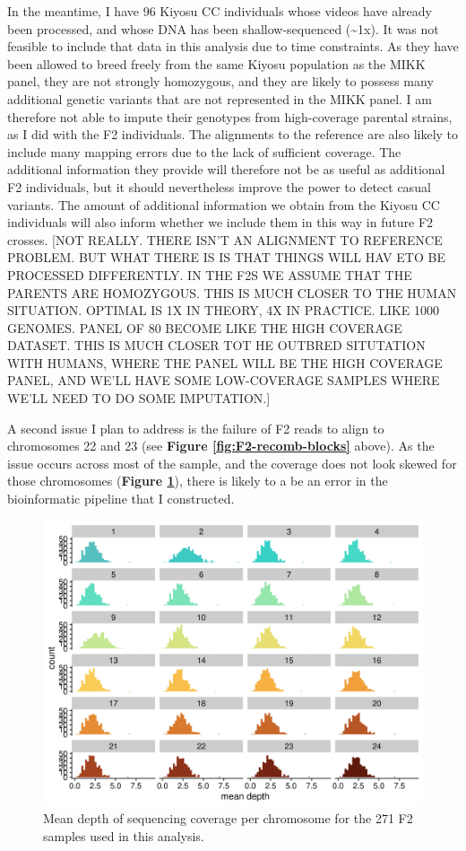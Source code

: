 \documentclass[
]{book}
\begin{document}
In the meantime, I have 96 Kiyosu CC individuals whose videos have already been processed, and whose DNA has been shallow-sequenced (\textasciitilde1x). It was not feasible to include that data in this analysis due to time constraints. As they have been allowed to breed freely from the same Kiyosu population as the MIKK panel, they are not strongly homozygous, and they are likely to possess many additional genetic variants that are not represented in the MIKK panel. I am therefore not able to impute their genotypes from high-coverage parental strains, as I did with the F2 individuals. The alignments to the reference are also likely to include many mapping errors due to the lack of sufficient coverage. The additional information they provide will therefore not be as useful as additional F2 individuals, but it should nevertheless improve the power to detect casual variants. The amount of additional information we obtain from the Kiyosu CC individuals will also inform whether we include them in this way in future F2 crosses. {[}NOT REALLY. THERE ISN'T AN ALIGNMENT TO REFERENCE PROBLEM. BUT WHAT THERE IS IS THAT THINGS WILL HAV ETO BE PROCESSED DIFFERENTLY. IN THE F2S WE ASSUME THAT THE PARENTS ARE HOMOZYGOUS. THIS IS MUCH CLOSER TO THE HUMAN SITUATION. OPTIMAL IS 1X IN THEORY, 4X IN PRACTICE. LIKE 1000 GENOMES. PANEL OF 80 BECOME LIKE THE HIGH COVERAGE DATASET. THIS IS MUCH CLOSER TOT HE OUTBRED SITUTATION WITH HUMANS, WHERE THE PANEL WILL BE THE HIGH COVERAGE PANEL, AND WE'LL HAVE SOME LOW-COVERAGE SAMPLES WHERE WE'LL NEED TO DO SOME IMPUTATION.{]}

A second issue I plan to address is the failure of F2 reads to align to chromosomes 22 and 23 (see \textbf{Figure \ref{fig:F2-recomb-blocks}} above). As the issue occurs across most of the sample, and the coverage does not look skewed for those chromosomes (\textbf{Figure \ref{fig:F2-coverage}}), there is likely to a be an error in the bioinformatic pipeline that I constructed.



\begin{figure}
\includegraphics[width=1\linewidth]{figs/mikk_behaviour/coverage_F2} \caption{Mean depth of sequencing coverage per chromosome for the 271 F2 samples used in this analysis.}\label{fig:F2-coverage}
\end{figure}
\end{document}
